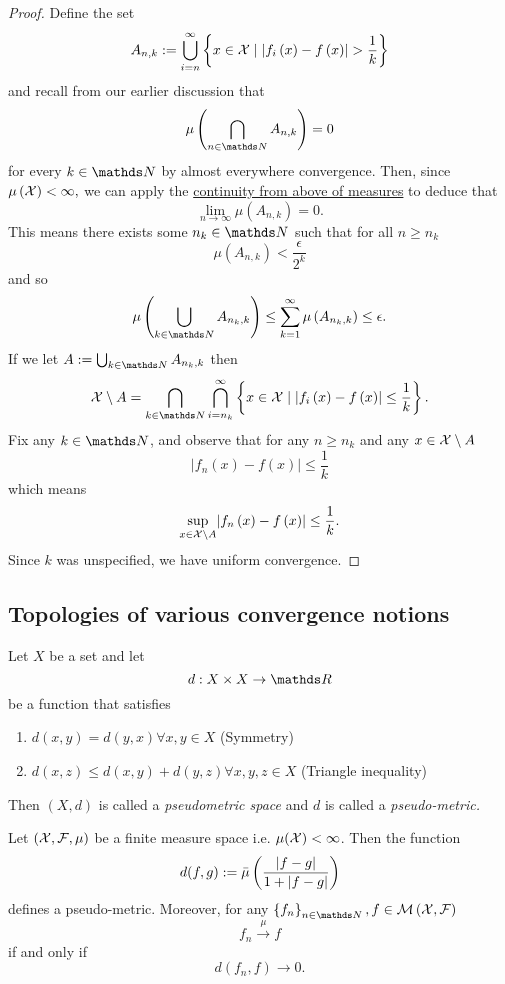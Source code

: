 \begin{proof}
Define the set 
\[
A_{n,k}:=\bigcup_{i=n}^{\infty}\left\{ x\in\mathcal{X}\mid\lvert f_{i}\left(x\right)-f\left(x\right)\rvert>\frac{1}{k}\right\} 
\]
and recall from our earlier discussion that 
\[
\mu\left(\bigcap_{n\in\N}A_{n,k}\right)=0
\]
for every $k\in\N$ by almost everywhere convergence. Then, since
$\mu\left(\mathcal{X}\right)<\infty,$ we can apply the \hyperref[prop:equivalenceContinuityMeasures]{continuity from above of measures}
to deduce that 
\[
\lim_{n\to\infty}\mu\left(A_{n,k}\right)=0.
\]
This means there exists some $n_{k}\in\N$ such that for all $n\geq n_{k}$
\[
\mu\left(A_{n,k}\right)<\frac{\epsilon}{2^{k}}
\]
and so
\[
\mu\left(\bigcup_{k\in\N}A_{n_{k},k}\right)\leq\sum_{k=1}^{\infty}\mu\left(A_{n_{k},k}\right)\leq\epsilon.
\]
If we let $A:=\bigcup_{k\in\N}A_{n_{k},k}$ then
\[
\X\setminus A=\bigcap_{k\in\N}\bigcap_{i=n_{k}}^{\infty}\left\{ x\in\X\mid\left\lvert f_{i}\left(x\right)-f\left(x\right)\right\rvert \leq\frac{1}{k}\right\} .
\]
Fix any $k\in\N$, and observe that for any $n\geq n_{k}$ and any
$x\in\mathcal{X}\setminus A$
\[
\lvert f_{n}\left(x\right)-f\left(x\right)\rvert\leq\frac{1}{k}
\]
which means 
\[
\sup_{x\in\mathcal{X}\setminus A}\lvert f_{n}\left(x\right)-f\left(x\right)\rvert\leq\frac{1}{k}.
\]
Since $k$ was unspecified, we have uniform convergence.
\end{proof}

\subsection{Topologies of various convergence notions}
\begin{defn}
\label{def:pseudoMetric}Let $X$ be a set and let 
\[
d:X\times X\to\R
\]
be a function that satisfies\begin{enumerate}[label=(\roman*),leftmargin=.1\linewidth,rightmargin=.4\linewidth]
	\item $ d(x,y) = d(y,x) \forall x,y \in X$ (Symmetry)
	\item $ d(x,z) \leq d(x,y) + d(y,z) \forall x,y,z \in X $ (Triangle inequality)
\end{enumerate}

Then $(X,d)$ is called a \emph{pseudometric space }and $d$ is called
a \emph{pseudo-metric.}
\end{defn}

\begin{prop}
\label{prop:pseudoMetricConvMeasure}Let $\left(\mathcal{X},\mathcal{F},\mu\right)$
be a finite measure space i.e. $\mu(\mathcal{X})<\infty$. Then the function
\[
d(f,g):=\bar{\mu}\left(\frac{\lvert f-g\rvert}{1+\lvert f-g\rvert}\right)
\]
defines a pseudo-metric. Moreover, for any $\left\{ f_{n}\right\} _{n\in\N},f\in\measurableFunctions$
\[
f_{n}\stackrel{\mu}{\longrightarrow}f
\]
if and only if
\[
d(f_{n},f)\longrightarrow0.
\]
\end{prop}

